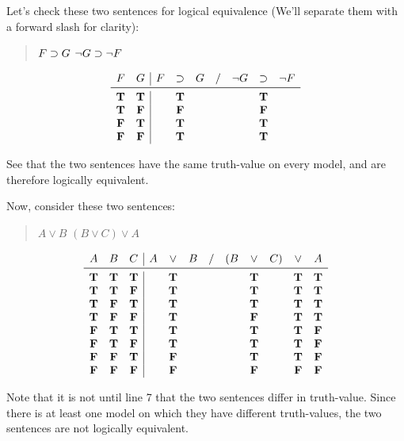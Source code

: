 \documentclass[../logic-text.tex]{subfiles}
\begin{document}
Let's check these two sentences for logical equivalence (We'll separate them with a forward slash for clarity):

\begin{quote}
  \(F \supset G\) \phantom{xxxxx} \(\neg G \supset \neg F \)
\end{quote}


\[
\begin{array}{cc|ccccccc}
  F & G & F & \lif & G & / & \lneg G & \lif & \lneg F \\ \midrule
  \true & \true && \true &&&& \true & \\
  \true & \false && \false &&&& \false & \\
  \false & \true && \true &&&& \true & \\
  \false & \false && \true &&&& \true & \\
\end{array}
\]


See that the two sentences have the same truth-value on every model, and are therefore logically equivalent.

Now, consider these two sentences:

\begin{quote}
  \( A \lor B\) \phantom{xxxxx} \((B \lor C) \lor A\)
\end{quote}

\[
  \begin{array}{ccc|ccccccccc}
    A & B & C & A & \lor & B & / & (B & \lor & C) & \lor & A \\ \midrule
    \true & \true & \true & & \true &&&& \true && \true & \true \\
    \true & \true & \false & & \true &&&& \true && \true & \true \\
    \true & \false & \true & & \true &&&& \true && \true & \true \\
    \true & \false & \false & & \true &&&& \false && \true & \true \\
    \false & \true & \true & & \true &&&& \true && \true &  \false \\
    \false & \true & \false & & \true &&&& \true && \true &  \false \\
    \false & \false & \true & & \false &&&& \true && \true &  \false \\
    \false & \false & \false & & \false &&&& \false && \false &  \false \\
  \end{array}
\]

Note that it is not until line 7 that the two sentences differ in truth-value.
Since there is at least one model on which they have different truth-values, the two sentences are not logically equivalent.
\end{document}
